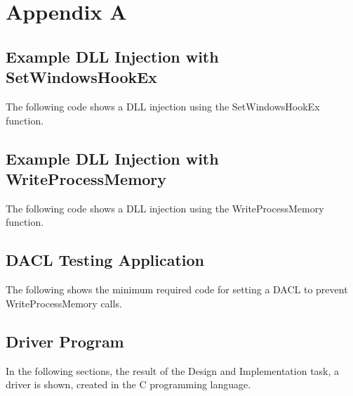 \section{Appendix A}
\label{sec:appendix}

\subsection{Example DLL Injection with SetWindowsHookEx}
The following code shows a DLL injection using the SetWindowsHookEx function.

\subsection{Example DLL Injection with WriteProcessMemory}
The following code shows a DLL injection using the WriteProcessMemory function.

\subsection{DACL Testing Application}
The following shows the minimum required code for setting a DACL to prevent WriteProcessMemory calls.


\subsection{Driver Program}

In the following sections, the result of the Design and Implementation task, a driver is shown, created in the C programming language.
